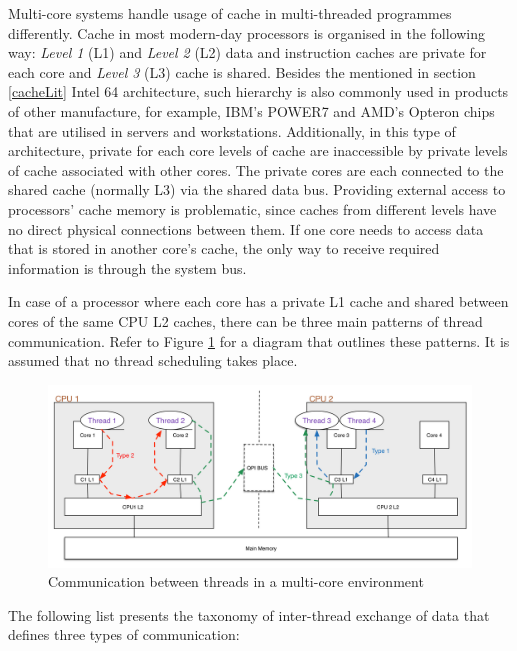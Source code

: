Multi-core systems handle usage of cache in multi-threaded programmes differently. Cache in most modern-day processors is organised in the following way: \textit{Level 1} (L1) and \textit{Level 2} (L2) data and instruction caches are private for each core and \textit{Level 3} (L3) cache is shared. Besides the mentioned in section \ref{cacheLit} Intel 64 architecture, such hierarchy is also commonly used in products of other manufacture, for example, IBM's POWER7 \cite{IBM2010} and AMD's Opteron \cite{Conway2011} chips that are utilised in servers and workstations. Additionally, in this type of architecture, private for each core levels of cache are inaccessible by private levels of cache associated with other cores. The private cores are each connected to the shared cache (normally L3) via the shared data bus. Providing external access to processors' cache memory is problematic, since caches from different levels have no direct physical connections between them. If one core needs to access data that is stored in another core's cache, the only way to receive required information is through the system bus.

In case of a processor where each core has a private L1 cache and shared between cores of the same CPU L2 caches, there can be three main patterns of thread communication. Refer to Figure \ref{Threads_cpu_diagram} for a diagram that outlines these patterns. It is assumed that no thread scheduling takes place. 

\begin{figure}[ht!]
\centering
\includegraphics[width=145mm]{3/Threads_cpu_diagram.png}
\caption{Communication between threads in a multi-core environment}
\label{Threads_cpu_diagram}
\end{figure}

The following list presents the taxonomy of inter-thread exchange of data that defines three types of communication:

